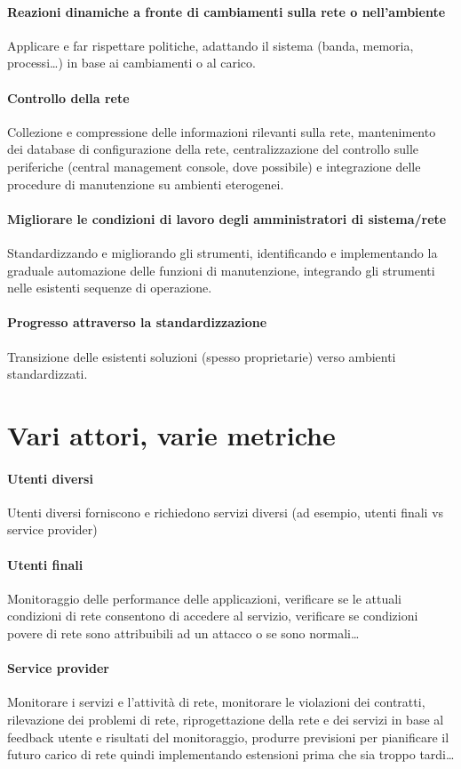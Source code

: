 \documentclass[10pt]{book}
\begin{document}
\paragraph{Reazioni dinamiche a fronte di cambiamenti sulla rete o nell'ambiente} Applicare e far rispettare politiche, adattando il sistema (banda, memoria, processi\ldots) in base ai cambiamenti o al carico.
\paragraph{Controllo della rete} Collezione e compressione delle informazioni rilevanti sulla rete, mantenimento dei database di configurazione della rete, centralizzazione del controllo sulle periferiche (central management console, dove possibile) e integrazione delle procedure di manutenzione su ambienti eterogenei.
\paragraph{Migliorare le condizioni di lavoro degli amministratori di sistema/rete} Standardizzando e migliorando gli strumenti, identificando e implementando la graduale automazione delle funzioni di manutenzione, integrando gli strumenti nelle esistenti sequenze di operazione.
\paragraph{Progresso attraverso la standardizzazione} Transizione delle esistenti soluzioni (spesso proprietarie) verso ambienti standardizzati.
\section{Vari attori, varie metriche}
\paragraph{Utenti diversi} Utenti diversi forniscono e richiedono servizi diversi (ad esempio, utenti finali vs service provider)
\paragraph{Utenti finali} Monitoraggio delle performance delle applicazioni, verificare se le attuali condizioni di rete consentono di accedere al servizio, verificare se condizioni povere di rete sono attribuibili ad un attacco o se sono normali\ldots
\paragraph{Service provider} Monitorare i servizi e l'attività di rete, monitorare le violazioni dei contratti, rilevazione dei problemi di rete, riprogettazione della rete e dei servizi in base al feedback utente e risultati del monitoraggio, produrre previsioni per pianificare il futuro carico di rete quindi implementando estensioni prima che sia troppo tardi\ldots
\end{document}
